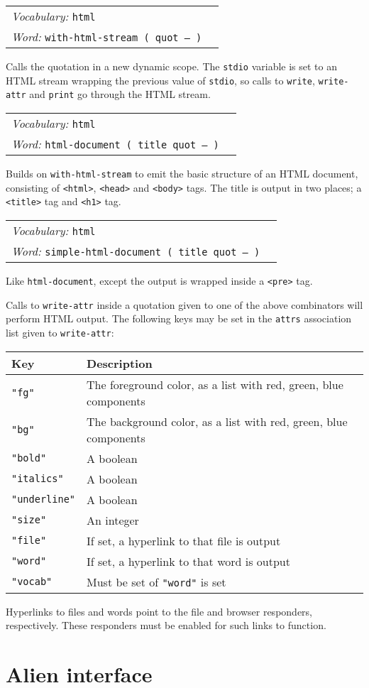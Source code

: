 \documentclass{book}
\newcommand{\vocabulary}[1]{\emph{Vocabulary:} \texttt{#1}&\\}
\newcommand{\ordinaryword}[2]{\index{\texttt{#1}}\emph{Word:} \texttt{#2}&\\}
\newcommand{\wordtable}[1]{


\begin{tabularx}{12cm}{lX}
\hline
#1
\hline
\end{tabularx}

}
\begin{document}
\wordtable{
\vocabulary{html}
\ordinaryword{with-html-stream}{with-html-stream ( quot -- )}
}
Calls the quotation in a new dynamic scope. The \texttt{stdio} variable is set to an HTML stream wrapping the previous value of \texttt{stdio}, so calls to \texttt{write}, \texttt{write-attr} and \texttt{print} go through the HTML stream.

\wordtable{
\vocabulary{html}
\ordinaryword{html-document}{html-document ( title quot -- )}
}
Builds on \texttt{with-html-stream} to emit the basic structure of an HTML document, consisting of \texttt{<html>}, \texttt{<head>} and \texttt{<body>} tags. The title is output in two places; a \texttt{<title>} tag  and \texttt{<h1>} tag.

\wordtable{
\vocabulary{html}
\ordinaryword{simple-html-document}{simple-html-document ( title quot -- )}
}
Like \texttt{html-document}, except the output is wrapped inside a \texttt{<pre>} tag.

Calls to \texttt{write-attr} inside a quotation given to one of the above combinators will perform HTML output. The following keys may be set in the \texttt{attrs} association list given to \texttt{write-attr}:

\begin{tabular}{l|l}
Key&Description\\
\hline
\texttt{"fg"}&The foreground color, as a list with red, green, blue components\\
\texttt{"bg"}&The background color, as a list with red, green, blue components\\
\texttt{"bold"}&A boolean\\
\texttt{"italics"}&A boolean\\
\texttt{"underline"}&A boolean\\
\texttt{"size"}&An integer\\
\texttt{"file"}&If set, a hyperlink to that file is output\\
\texttt{"word"}&If set, a hyperlink to that word is output\\
\texttt{"vocab"}&Must be set of \texttt{"word"} is set
\end{tabular}

Hyperlinks to files and words point to the file and browser responders, respectively. These responders must be enabled for such links to function.

\section{Alien interface}
\end{document}
